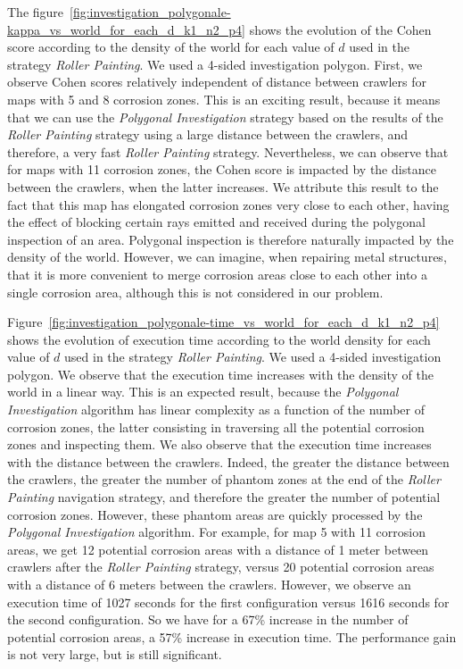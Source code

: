 The figure~\ref{fig:investigation_polygonale-kappa_vs_world_for_each_d_k1_n2_p4} shows the evolution of the Cohen score according to the density of the world for each value of $d$ used in the strategy \textit{Roller Painting}.
We used a 4-sided investigation polygon.
First, we observe Cohen scores relatively independent of distance between crawlers for maps with 5 and 8 corrosion zones.
This is an exciting result, because it means that we can use the \textit{Polygonal Investigation} strategy based on the results of the \textit{Roller Painting} strategy using a large distance between the crawlers, and therefore, a very fast \textit{Roller Painting} strategy.
Nevertheless, we can observe that for maps with 11 corrosion zones, the Cohen score is impacted by the distance between the crawlers, when the latter increases.
We attribute this result to the fact that this map has elongated corrosion zones very close to each other, having the effect of blocking certain rays emitted and received during the polygonal inspection of an area.
Polygonal inspection is therefore naturally impacted by the density of the world.
However, we can imagine, when repairing metal structures, that it is more convenient to merge corrosion areas close to each other into a single corrosion area, although this is not considered in our problem.

Figure~\ref{fig:investigation_polygonale-time_vs_world_for_each_d_k1_n2_p4} shows the evolution of execution time according to the world density for each value of $d$ used in the strategy \textit{Roller Painting}.
We used a 4-sided investigation polygon.
We observe that the execution time increases with the density of the world in a linear way.
This is an expected result, because the \textit{Polygonal Investigation} algorithm has linear complexity as a function of the number of corrosion zones, the latter consisting in traversing all the potential corrosion zones and inspecting them.
We also observe that the execution time increases with the distance between the crawlers.
Indeed, the greater the distance between the crawlers, the greater the number of phantom zones at the end of the \textit{Roller Painting} navigation strategy, and therefore the greater the number of potential corrosion zones.
However, these phantom areas are quickly processed by the \textit{Polygonal Investigation} algorithm.
For example, for map 5 with 11 corrosion areas, we get 12 potential corrosion areas with a distance of 1 meter between crawlers after the \textit{Roller Painting} strategy, versus 20 potential corrosion areas with a distance of 6 meters between the crawlers.
However, we observe an execution time of 1027 seconds for the first configuration versus 1616 seconds for the second configuration.
So we have for a 67\% increase in the number of potential corrosion areas, a 57\% increase in execution time.
The performance gain is not very large, but is still significant.

